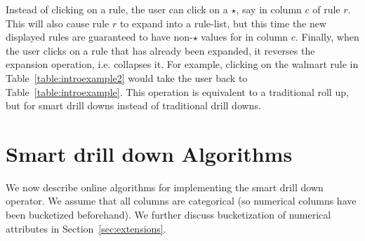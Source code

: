 \documentclass[10pt,journal,compsoc]{IEEEtran}
\newcommand{\papertext}[1]{}
\newcommand{\techreporttext}[1]{#1}
\begin{document}
Instead of clicking on a rule, the user can click on a $\star$, say in column $c$ of rule $r$. This will also cause rule $r$ to expand into a rule-list, but this time the new displayed rules are guaranteed to have non-$\star$ values for in column $c$. 
Finally, when the user clicks on a rule that has already been expanded, it reverses the expansion operation, i.e. collapses it. 
\techreporttext{ For example, clicking on the walmart rule in Table~\ref{table:introexample2} would take the user back to Table~\ref{table:introexample}. This operation is equivalent to a traditional roll up, but for smart drill downs instead of traditional drill downs.}

\section{Smart drill down Algorithms} \label{sec:algorithms}
We now describe online algorithms for implementing
the smart drill down operator. We assume that all columns are categorical (so numerical columns have been bucketized beforehand). \papertext{We further discuss bucketization of numerical attributes in the Extensions section in the technical report~\cite{tr}}\techreporttext{We further discuss bucketization of numerical attributes in Section~\ref{sec:extensions}}.
\end{document}
